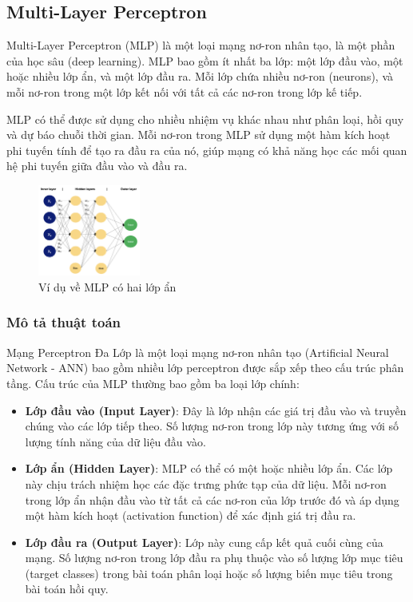 
\subsection{Multi-Layer Perceptron}

Multi-Layer Perceptron (MLP) là một loại mạng nơ-ron nhân tạo, là một phần của học sâu (deep learning). MLP bao gồm ít nhất ba lớp: một lớp đầu vào, một hoặc nhiều lớp ẩn, và một lớp đầu ra. Mỗi lớp chứa nhiều nơ-ron (neurons), và mỗi nơ-ron trong một lớp kết nối với tất cả các nơ-ron trong lớp kế tiếp.

MLP có thể được sử dụng cho nhiều nhiệm vụ khác nhau như phân loại, hồi quy và dự báo chuỗi thời gian. Mỗi nơ-ron trong MLP sử dụng một hàm kích hoạt phi tuyến tính để tạo ra đầu ra của nó, giúp mạng có khả năng học các mối quan hệ phi tuyến giữa đầu vào và đầu ra.
\begin{figure}[h]
    \centering
    \includegraphics[width=0.3\textwidth, height=0.3\textwidth]{img/MLP.png}
    \caption{Ví dụ về MLP có hai lớp ẩn}
    \label{fig:your_figure_label}
\end{figure}

\subsubsection{Mô tả thuật toán}
Mạng Perceptron Đa Lớp là một loại mạng nơ-ron nhân tạo (Artificial Neural Network - ANN) bao gồm nhiều lớp perceptron được sắp xếp theo cấu trúc phân tầng. Cấu trúc của MLP thường bao gồm ba loại lớp chính:

\begin{itemize}
    \item \textbf{Lớp đầu vào (Input Layer)}: Đây là lớp nhận các giá trị đầu vào và truyền chúng vào các lớp tiếp theo. Số lượng nơ-ron trong lớp này tương ứng với số lượng tính năng của dữ liệu đầu vào.
    \item \textbf{Lớp ẩn (Hidden Layer)}: MLP có thể có một hoặc nhiều lớp ẩn. Các lớp này chịu trách nhiệm học các đặc trưng phức tạp của dữ liệu. Mỗi nơ-ron trong lớp ẩn nhận đầu vào từ tất cả các nơ-ron của lớp trước đó và áp dụng một hàm kích hoạt (activation function) để xác định giá trị đầu ra.
    \item \textbf{Lớp đầu ra (Output Layer)}: Lớp này cung cấp kết quả cuối cùng của mạng. Số lượng nơ-ron trong lớp đầu ra phụ thuộc vào số lượng lớp mục tiêu (target classes) trong bài toán phân loại hoặc số lượng biến mục tiêu trong bài toán hồi quy.
\end{itemize}

